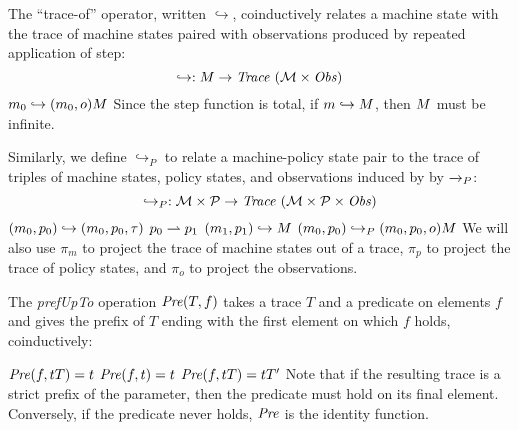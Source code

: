 \documentclass[acmsmall,review,anonymous]{acmart}\settopmatter{printfolios=true,printccs=false,printacmref=false}
\begin{document}
The ``trace-of'' operator, written \(\hookrightarrow\), coinductively
relates a machine state with the trace of machine states paired with
observations produced by repeated application of step:
%
\[\hookrightarrow : M \rightarrow \mathit{Trace}~({\mathcal M} \times \mathit{Obs})\]%
%
            {\(m_0 \hookrightarrow (m_0,o) M\)}%
%
\noindent
Since the step function is total, if \(m \hookrightarrow M\),
then \(M\) must be infinite.


Similarly, we define \(\hookrightarrow_P\) to relate a machine-policy
state pair to the trace of triples of machine states, policy states,
and observations induced by by \(\xrightarrow{}_P\):
%
\[\hookrightarrow_P : {\mathcal M} \times \mathcal{P} \rightarrow \mathit{Trace}~({\mathcal M} \times \mathcal{P} \times \mathit{Obs}) \]
%
         {\((m_0,p_0) \hookrightarrow (m_0,p_0,\tau)\)}
%
              {\(p_0 \rightharpoonup p_1\)}
              {\((m_1,p_1) \hookrightarrow M\)}
              {\((m_0,p_0) \hookrightarrow_P (m_0,p_0,o) M\)}
We will also use \(\pi_m\) to project the trace of machine states
out of a trace, \(\pi_p\) to project the trace of policy states, and
\(\pi_o\) to project the observations.

The {\it prefUpTo} operation \(\mathit{Pre}(T,f)\) takes a trace \(T\)
and a predicate on elements \(f\) and gives the prefix of \(T\)
ending with the first element on which \(f\) holds, coinductively:

         {\(\mathit{Pre}(f,tT) = t\)}
%
\judgment{}
         {\(\mathit{Pre}(f,t) = t\)}
%
            {\(\mathit{Pre}(f,tT) = tT'\)}
%
Note that if the resulting trace is a strict prefix of the parameter, then the
predicate must hold on its final element. Conversely, if the predicate never
holds, \(\mathit{Pre}\) is the identity function.

\end{document}
